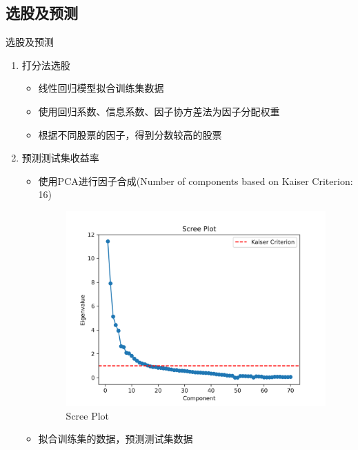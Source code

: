 \documentclass[CJK,aspectratio=43]{beamer}  %
\begin{document}
\subsection{选股及预测}
\begin{frame}{选股及预测}
	\begin{enumerate}
	\item 打分法选股
	\begin{itemize}
		\item 线性回归模型拟合训练集数据
		\item 使用回归系数、信息系数、因子协方差法为因子分配权重
		\item 根据不同股票的因子，得到分数较高的股票
	\end{itemize}
	\item 预测测试集收益率
	\begin{itemize}
		\item 使用PCA进行因子合成(Number of components based on Kaiser Criterion: 16)
		\begin{figure}
			\centering
			\includegraphics[width=0.58\linewidth]{pic/scree_plot}
			\caption{Scree Plot}
			\label{fig:screeplot}
		\end{figure}
		\item 拟合训练集的数据，预测测试集数据
	\end{itemize}
	\end{enumerate}
\end{frame}
\end{document}
